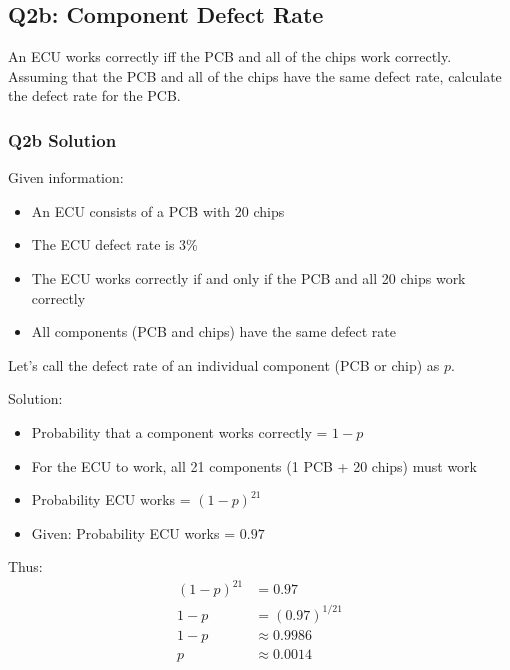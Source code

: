 \documentclass{article}
\begin{document}

\subsection*{Q2b: Component Defect Rate}

An ECU works correctly iff the PCB and all of the chips work correctly. Assuming that the PCB and all of the chips have the same defect rate, calculate the defect rate for the PCB.

\subsubsection*{Q2b Solution}

Given information:
\begin{itemize}
    \item An ECU consists of a PCB with 20 chips
    \item The ECU defect rate is 3\%
    \item The ECU works correctly if and only if the PCB and all 20 chips work correctly
    \item All components (PCB and chips) have the same defect rate
\end{itemize}

Let's call the defect rate of an individual component (PCB or chip) as $p$.

Solution:
\begin{itemize}
    \item Probability that a component works correctly = $1-p$
    \item For the ECU to work, all 21 components (1 PCB + 20 chips) must work
    \item Probability ECU works = $(1-p)^{21}$
    \item Given: Probability ECU works = $0.97$
\end{itemize}

Thus:
\begin{align}
(1-p)^{21} &= 0.97\\
1-p &= (0.97)^{1/21}\\
1-p &\approx 0.9986\\
p &\approx 0.0014
\end{align}

\end{document}
